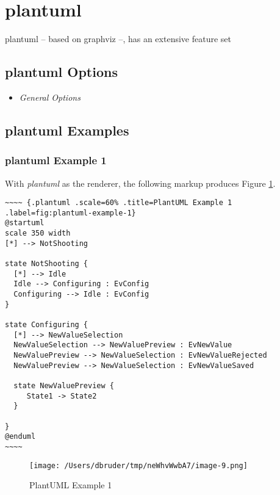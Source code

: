 \documentclass[]{article}
\begin{document}
\newpage

\section{plantuml}\label{plantuml}

plantuml -- based on graphviz --, has an extensive feature set

\subsection{plantuml Options}\label{plantuml-options}

\begin{itemize}
\itemsep1pt\parskip0pt
\item
  \emph{General Options}
\end{itemize}

\subsection{plantuml Examples}\label{plantuml-examples}

\subsubsection{plantuml Example 1}\label{plantuml-example-1}

With \emph{plantuml} as the renderer, the following markup produces
Figure \ref{fig:plantuml-example-1}.

\scriptsize

\begin{verbatim}
~~~~ {.plantuml .scale=60% .title=PlantUML Example 1 .label=fig:plantuml-example-1}
@startuml
scale 350 width
[*] --> NotShooting

state NotShooting {
  [*] --> Idle
  Idle --> Configuring : EvConfig
  Configuring --> Idle : EvConfig
}

state Configuring {
  [*] --> NewValueSelection
  NewValueSelection --> NewValuePreview : EvNewValue
  NewValuePreview --> NewValueSelection : EvNewValueRejected
  NewValuePreview --> NewValueSelection : EvNewValueSaved

  state NewValuePreview {
     State1 -> State2
  }

}
@enduml
~~~~
\end{verbatim}

\normalsize

\begin{figure}[htbp]
\centering
\texttt{[image: /Users/dbruder/tmp/neWhvWwbA7/image-9.png]}
\caption{PlantUML Example 1\label{fig:plantuml-example-1}}
\end{figure}
\end{document}
